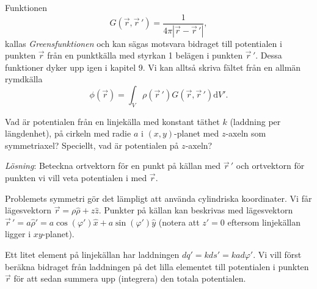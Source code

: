\documentclass[%
oneside,                 %
final,                   %
10pt]{article}
\newenvironment{notice_mdfboxadmon}[1][]{
\begin{notice_mdfboxmdframed}[frametitle=#1]
}
{
\end{notice_mdfboxmdframed}
}
\begin{document}
Funktionen
\begin{equation}
G\left( \vec{r},\vec{r}\,' \right) = \frac{1}{4 \pi \left| \vec{r} - \vec{r}\,' \right|},
\end{equation}
kallas \emph{Greensfunktionen} och kan sägas motsvara bidraget till potentialen i punkten $\vec{r}$ från en punktkälla med styrkan 1 belägen i punkten $\vec{r}\,'$. Dessa funktioner dyker upp igen i kapitel 9. Vi kan alltså skriva fältet från en allmän rymdkälla
\begin{equation}
\phi(\vec{r}) = \int_V \rho\left(\vec{r}\,'\right) G\left( \vec{r},\vec{r}\,' \right) \mbox{d}V'.
\end{equation}


\begin{notice_mdfboxadmon}

Vad är potentialen från en linjekälla med konstant täthet $k$ (laddning per längdenhet),  på cirkeln med radie $a$ i $(x,y)$-planet med $z$-axeln som symmetriaxel? Speciellt, vad är potentialen på $z$-axeln?

\emph{Lösning}:
Beteckna ortvektorn för en punkt på källan med $\vec{r}\,'$  och ortvektorn för punkten vi vill veta potentialen i med $\vec{r}$. 

Problemets symmetri gör det lämpligt att använda cylindriska koordinater. Vi får lägesvektorn $\vec{r} = \rho \hat{\rho} + z \hat{z}$. Punkter på källan kan beskrivas med lägesvektorn $\vec{r}\,' = a \hat{\rho}' = a\cos(\varphi') \hat{x} + a \sin(\varphi') \hat{y}$ (notera att $z'=0$ eftersom linjekällan ligger i $xy$-planet).

Ett litet element på linjekällan har laddningen $dq' = k ds' = k a d\varphi'$. Vi vill först beräkna bidraget från laddningen på det lilla elementet till potentialen i punkten $\vec{r}$ för att sedan summera upp (integrera) den totala potentialen.



\vspace{6mm}


\end{notice_mdfboxadmon}
\end{document}
